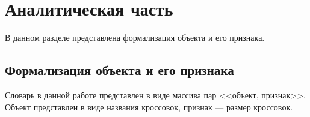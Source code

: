 \chapter{Аналитическая часть}

В данном разделе представлена формализация объекта и его признака. 

\section{Формализация объекта и его признака}

Словарь в данной работе представлен в виде массива пар <<объект, признак>>.
Объект представлен в виде названия кроссовок, признак --- размер кроссовок.



